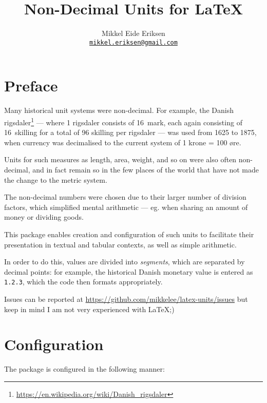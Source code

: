 \documentclass{article}
\title{Non-Decimal Units for \LaTeX}
\author{Mikkel Eide Eriksen\\\href{mailto:mikkel.eriksen@gmail.com}{\texttt{mikkel.eriksen@gmail.com}}}
\begin{document}
\maketitle

\section{Preface} %

Many historical unit systems were non-decimal. For example, the Danish rigsdaler\footnote{\url{https://en.wikipedia.org/wiki/Danish_rigsdaler}} --- where 1 rigsdaler consists of 16~mark, each again consisting of 16~skilling for a total of 96 skilling per rigsdaler --- was used from 1625 to 1875, when currency was decimalised to the current system of 1 krone = 100 øre.


Units for such measures as length, area, weight, and so on were also often non-decimal, and in fact remain so in the few places of the world that have not made the change to the metric system.

The non-decimal numbers were chosen due to their larger number of division factors, which simplified mental arithmetic --- eg. when sharing an amount of money or dividing goods.

This package enables creation and configuration of such units to facilitate their presentation in textual and tabular contexts, as well as simple arithmetic.

In order to do this, values are divided into \emph{segments}, which are separated by decimal points: for example, the historical Danish monetary value  is entered as \texttt{1.2.3}, which the code then formats appropriately.

Issues can be reported at \url{https://github.com/mikkelee/latex-units/issues} but keep in mind I am not very experienced with \LaTeX ;)

\clearpage
\section{Configuration} %

The package is configured in the following manner:
\end{document}
